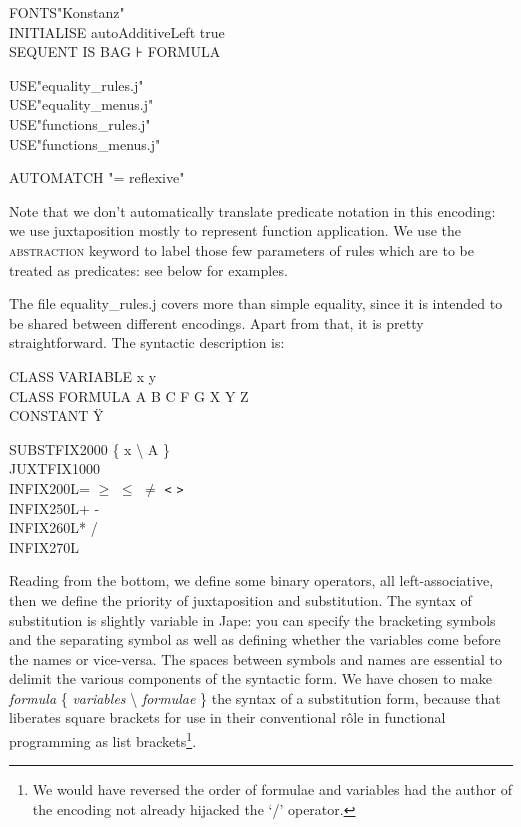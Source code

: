 \documentclass[11pt]{book}
\newcommand{\tab}{\hspace{5mm}}
\begin{document}
FONTS\tab "Konstanz"\\
INITIALISE autoAdditiveLeft true\\
SEQUENT IS BAG ⊦ FORMULA

USE\tab "equality\_rules.j"\\
USE\tab "equality\_menus.j"\\
USE\tab "functions\_rules.j"\\
USE\tab "functions\_menus.j"

AUTOMATCH "= reflexive"


Note that we don't automatically translate predicate notation in this encoding: we use juxtaposition mostly to represent function application. We use the \textsc{abstraction} keyword to label those few parameters of rules which are to be treated as predicates: see below for examples.


The file equality\_rules.j covers more than simple equality, since it is intended to be shared between different encodings. Apart from that, it is pretty straightforward. The syntactic description is:

CLASS VARIABLE x y\\
CLASS FORMULA A B C F G X Y Z\\
CONSTANT \"{Y}

SUBSTFIX\tab 2000 \{ x {\textbackslash} A \}\\
JUXTFIX\tab 1000\\
INFIX\tab 200L\tab = \ensuremath{\geq} \ensuremath{\leq} \ensuremath{\neq} \texttt{<} \texttt{>}\\
INFIX\tab 250L\tab + -\\
INFIX\tab 260L\tab * /\\
INFIX\tab 270L\tab {\textasciicircum}


Reading from the bottom, we define some binary operators, all left-associative, then we define the priority of juxtaposition and substitution. The syntax of substitution is slightly variable in Jape: you can specify the bracketing symbols and the separating symbol as well as defining whether the variables come before the names or vice-versa. The spaces between symbols and names are essential to delimit the various components of the syntactic form. We have chosen to make \textit{formula} \{ \textit{variables} {\textbackslash} \textit{formulae} \} the syntax of a substitution form, because that liberates square brackets for use in their conventional r\^{o}le in functional programming as list brackets\footnote{We would have reversed the order of formulae and variables had the author of the encoding not already hijacked the `/' operator.}.
\end{document}

